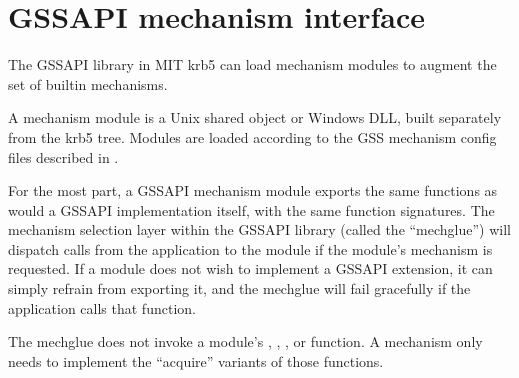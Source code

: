 \documentclass[letterpaper,10pt,english]{sphinxmanual}
\begin{document}
\begin{sphinxVerbatim}[commandchars=\\\{\}]
     
                     

     
                     
      
      
      
     
\end{sphinxVerbatim}

\sphinxstepscope


\section{GSSAPI mechanism interface}
\label{\detokenize{plugindev/gssapi:gssapi-mechanism-interface}}\label{\detokenize{plugindev/gssapi::doc}}
\sphinxAtStartPar
The GSSAPI library in MIT krb5 can load mechanism modules to augment
the set of built\sphinxhyphen{}in mechanisms.

\sphinxAtStartPar
A mechanism module is a Unix shared object or Windows DLL, built
separately from the krb5 tree.  Modules are loaded according to the
GSS mechanism config files described in .

\sphinxAtStartPar
For the most part, a GSSAPI mechanism module exports the same
functions as would a GSSAPI implementation itself, with the same
function signatures.  The mechanism selection layer within the GSSAPI
library (called the “mechglue”) will dispatch calls from the
application to the module if the module’s mechanism is requested.  If
a module does not wish to implement a GSSAPI extension, it can simply
refrain from exporting it, and the mechglue will fail gracefully if
the application calls that function.

\sphinxAtStartPar
The mechglue does not invoke a module’s ,
, , or
 function.  A mechanism only needs to
implement the “acquire” variants of those functions.
\end{document}
